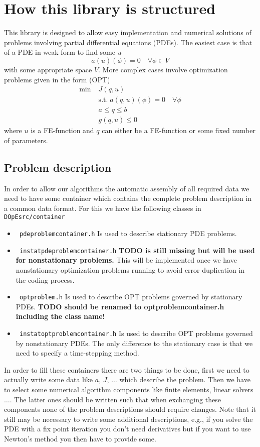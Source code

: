 \section{How this library is structured}
This library is designed to allow easy implementation and numerical solutions 
of problems involving partial differential equations (PDEs). The easiest case 
is that of a PDE in weak form to find some $u$
\[
a(u)(\phi) = 0 \quad \forall \phi \in V
\]
with some appropriate space $V$.
More complex cases involve optimization problems given in the form (OPT)
\begin{align*}
\min\;&J(q,u) \\
  &\text{s.t.}\; a(q,u)(\phi) = 0 \quad \forall \phi\\
  &a \le q \le b\\
  &g(q,u) \le 0  
\end{align*}
where $u$ is a FE-function and $q$ can either be a FE-function or some 
fixed number of parameters.

\subsection{Problem description}
In order to allow our algorithms the automatic assembly of all required 
data we need to have some container which contains the complete problem 
description in a common data format. For this we have the following 
classes in \texttt{ DOpEsrc/container}
\begin{itemize}
  \item \texttt{ pdeproblemcontainer.h} Is used to describe  stationary PDE problems.
  \item \texttt{ instatpdeproblemcontainer.h} {\bf TODO is still missing but will be used for nonstationary problems.} This will be implemented once we have nonstationary optimization problems running to avoid error duplication in the coding process.
  \item \texttt{ optproblem.h} Is used to describe  OPT problems governed by 
    stationary PDEs. {\bf TODO should be renamed to optproblemcontainer.h including the class name!}
  \item \texttt{ instatoptproblemcontainer.h} Is used to describe  OPT problems governed by nonstationary PDEs. The only difference to the stationary case is that we need to specify a time-stepping method.  
\end{itemize}
In order to fill these containers there are two things to be done,
first we need to actually write some data like $a$, $J$, $\ldots$
which describe the problem. Then we have to select some numerical 
algorithm components like finite elements, linear solvers $\ldots$.
The latter ones should be written such that when exchanging these components
none of the problem descriptions should require changes. 
Note that it still may be necessary to write some additional descriptions, 
e.g., if you solve the PDE with a fix point iteration you don't need derivatives
but if you want to use Newton's method you then have to provide some.

